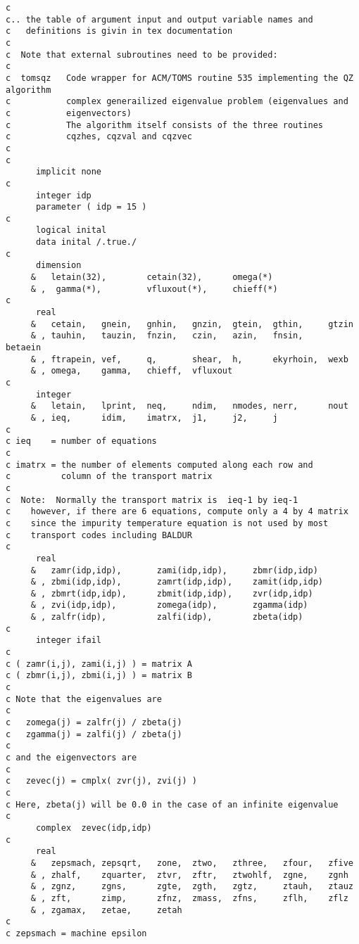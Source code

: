 \begin{verbatim}
c
c.. the table of argument input and output variable names and 
c   definitions is givin in tex documentation
c
c  Note that external subroutines need to be provided:
c
c  tomsqz   Code wrapper for ACM/TOMS routine 535 implementing the QZ algorithm
c           complex generailized eigenvalue problem (eigenvalues and 
c           eigenvectors) 
c           The algorithm itself consists of the three routines 
c           cqzhes, cqzval and cqzvec
c
c
      implicit none
c
      integer idp
      parameter ( idp = 15 )
c
      logical inital
      data inital /.true./
c
      dimension   
     &   letain(32),        cetain(32),      omega(*)
     & ,  gamma(*),         vfluxout(*),     chieff(*)
c
      real 
     &   cetain,   gnein,   gnhin,   gnzin,  gtein,  gthin,     gtzin
     & , tauhin,   tauzin,  fnzin,   czin,   azin,   fnsin,     betaein
     & , ftrapein, vef,     q,       shear,  h,      ekyrhoin,  wexb
     & , omega,    gamma,   chieff,  vfluxout 
c
      integer 
     &   letain,   lprint,  neq,     ndim,   nmodes, nerr,      nout
     & , ieq,      idim,    imatrx,  j1,     j2,     j
c
c ieq    = number of equations
c
c imatrx = the number of elements computed along each row and
c          column of the transport matrix
c
c  Note:  Normally the transport matrix is  ieq-1 by ieq-1
c    however, if there are 6 equations, compute only a 4 by 4 matrix
c    since the impurity temperature equation is not used by most
c    transport codes including BALDUR
c
      real 
     &   zamr(idp,idp),       zami(idp,idp),     zbmr(idp,idp)
     & , zbmi(idp,idp),       zamrt(idp,idp),    zamit(idp,idp)
     & , zbmrt(idp,idp),      zbmit(idp,idp),    zvr(idp,idp)
     & , zvi(idp,idp),        zomega(idp),       zgamma(idp)
     & , zalfr(idp),          zalfi(idp),        zbeta(idp)
c
      integer ifail
c
c ( zamr(i,j), zami(i,j) ) = matrix A
c ( zbmr(i,j), zbmi(i,j) ) = matrix B
c
c Note that the eigenvalues are
c
c   zomega(j) = zalfr(j) / zbeta(j)
c   zgamma(j) = zalfi(j) / zbeta(j)
c
c and the eigenvectors are
c
c   zevec(j) = cmplx( zvr(j), zvi(j) )
c
c Here, zbeta(j) will be 0.0 in the case of an infinite eigenvalue
c
      complex  zevec(idp,idp)
c
      real  
     &   zepsmach, zepsqrt,   zone,  ztwo,   zthree,   zfour,   zfive
     & , zhalf,    zquarter,  ztvr,  zftr,   ztwohlf,  zgne,    zgnh
     & , zgnz,     zgns,      zgte,  zgth,   zgtz,     ztauh,   ztauz
     & , zft,      zimp,      zfnz,  zmass,  zfns,     zflh,    zflz
     & , zgamax,   zetae,     zetah
c
c zepsmach = machine epsilon

\end{verbatim}
